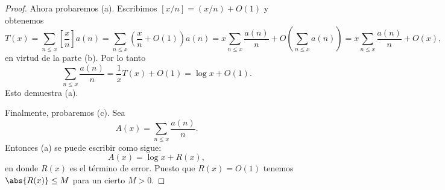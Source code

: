 \documentclass[12pt,a4paper]{book}
\begin{document}
\begin{proof}
        Ahora probaremos (a). Escribimos $[x/n]=(x/n)+O(1)$ y obtenemos
        \begin{equation*}
            T(x)=\sum_{n\leq x}\left[\frac{x}{n}\right]a(n)=\sum_{n\leq x}\left(\frac{x}{n}+O(1)\right)a(n)
            =x\sum_{n\leq x}\frac{a(n)}{n}+O\left(\sum_{n\leq x}a(n)\right)=x\sum_{n\leq x}\frac{a(n)}{n}+O(x),
        \end{equation*}
        en virtud de la parte (b). Por lo tanto
        \begin{equation*}
            \sum_{n\leq x}\frac{a(n)}{n}=\frac{1}{x}T(x)+O(1)=\log x+O(1).
        \end{equation*}
        Esto demuestra (a).

        Finalmente, probaremos (c). Sea
        \begin{equation*}
            A(x)=\sum_{n\leq x}\frac{a(n)}{n}.
        \end{equation*}
        Entonces (a) se puede escribir como sigue:
        \begin{equation*}
            A(x)=\log x+R(x),
        \end{equation*}
        en donde $R(x)$ es el término de error. Puesto que $R(x)=O(1)$ tenemos
        $\abs{R(x)}\leq M$ para un cierto $M>0$.


\end{proof}
\end{document}
